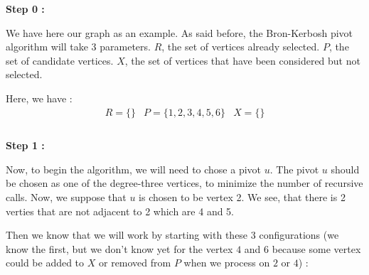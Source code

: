     \hspace*{1cm} \textbf{Step 0 :}
    \\
    \begin{minipage}{0.4\textwidth}
    \end{minipage}
    \begin{minipage}{0.6\textwidth}
        We have here our graph as an example. As said before, the Bron-Kerbosh pivot algorithm will take 3 parameters. $R$, the set of vertices already selected. $P$, the set of candidate vertices. $X$, the set of vertices that have been considered but not selected.
    \end{minipage}
    Here, we have :
    $$ \boxed{
            \begin{array}{lll}
                R = \{\} & P = \{1,2,3,4,5,6\} & X = \{\} \\
            \end{array}
    }$$
    \\ 
    \hspace*{1cm}  \textbf{Step 1 :}
    \\
    \begin{minipage}{0.4\textwidth}
    \end{minipage}
    \begin{minipage}{0.6\textwidth}
        Now, to begin the algorithm, we will need to chose a pivot $u$. The pivot $u$ should be chosen as one of the degree-three vertices, to minimize the number of recursive calls. Now, we suppose that $u$ is chosen to be vertex 2. We see, that there is 2 verties that are not adjacent to 2 which are 4 and 5.
    \end{minipage}
    Then we know that we will work by starting with these 3 configurations (we know the first, but we don't know yet for the vertex $4$ and $6$ because some vertex could be added to $X$ or removed from $P$ when we process on $2$ or $4$) :
